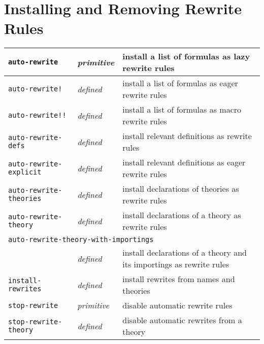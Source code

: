 \documentclass[12pt,twoside]{book}
\makeatletter
\newcommand{\indtt}[1]{\texttt{#1}\index{#1@{\texttt{#1}}}}  %
\newcommand{\indttbang}[1]{\texttt{#1!}\index{#1"!@{\texttt{#1"!}}}}
\newcommand{\indttdbang}[1]{\texttt{#1!!}\index{#1"!"!@{\texttt{#1"!"!}}}}
\makeatother
\begin{document}
\section{Installing and Removing Rewrite Rules}
\begin{tabularx}{\textwidth}{|l|l|X|}\hline
\indtt{auto-rewrite} & \emph{primitive}
  & install a list of formulas as lazy rewrite rules\\\hline
\indttbang{auto-rewrite} & \emph{defined}
  & install a list of formulas as eager rewrite rules\\\hline
\indttdbang{auto-rewrite} & \emph{defined}
  & install a list of formulas as macro rewrite rules\\\hline
\indtt{auto-rewrite-defs} & \emph{defined}
  & install relevant definitions as rewrite rules\\\hline
\indtt{auto-rewrite-explicit} & \emph{defined}
  & install relevant definitions as eager rewrite rules\\\hline
\indtt{auto-rewrite-theories} & \emph{defined}
  & install declarations of theories as rewrite rules\\\hline
\indtt{auto-rewrite-theory} & \emph{defined}
  & install declarations of a theory as rewrite rules\\\hline
\multicolumn{3}{|l|}{\indtt{auto-rewrite-theory-with-importings}}\\
  & \emph{defined}
  & install declarations of a theory and its importings as rewrite rules\\\hline
\indtt{install-rewrites} & \emph{defined}
  & install rewrites from names and theories \\\hline 
\indtt{stop-rewrite} & \emph{primitive}
  & disable automatic rewrite rules \\\hline
\indtt{stop-rewrite-theory} & \emph{defined}
  & disable automatic rewrites from a theory\\\hline
\end{tabularx}
\end{document}
